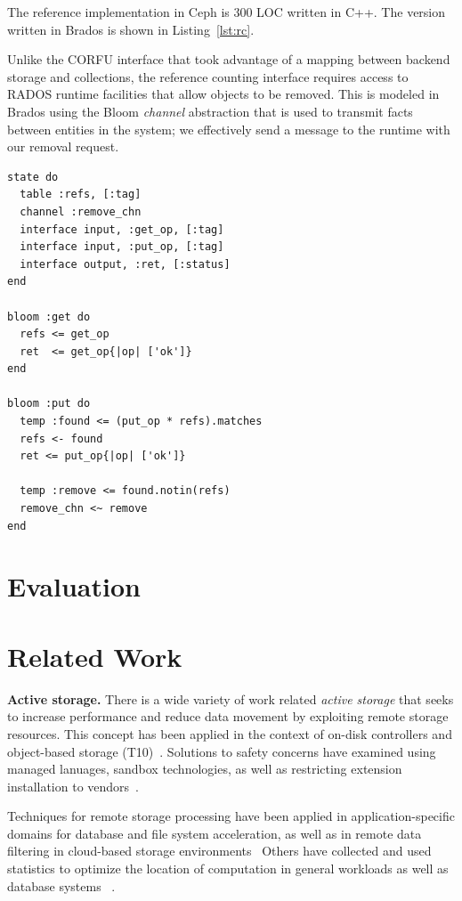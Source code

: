 \documentclass[10pt,twocolumn]{article}
\begin{document}
The reference implementation in Ceph is 300 LOC written in C++. The version
written in Brados is shown in Listing~\ref{lst:rc}.

 Unlike the CORFU interface
that took advantage of a mapping between backend storage and collections, the
reference counting interface requires access to RADOS runtime facilities that
allow objects to be removed. This is modeled in Brados using the Bloom
\emph{channel} abstraction that is used to transmit facts between entities in
the system; we effectively send a message to the runtime with our removal
request.

\begin{lstlisting}[caption={Reference counting interface}, label=lst:rc]
state do
  table :refs, [:tag]
  channel :remove_chn
  interface input, :get_op, [:tag]
  interface input, :put_op, [:tag]
  interface output, :ret, [:status]
end

bloom :get do
  refs <= get_op
  ret  <= get_op{|op| ['ok']}
end

bloom :put do
  temp :found <= (put_op * refs).matches
  refs <- found
  ret <= put_op{|op| ['ok']}

  temp :remove <= found.notin(refs)	
  remove_chn <~ remove
end
\end{lstlisting}

\section{Evaluation}

\section{Related Work}

{\bf Active storage.}
There is a wide variety of work related \emph{active storage} that seeks to
increase performance and reduce data movement by exploiting remote storage
resources. This concept has been applied in the context of on-disk
controllers and object-based storage
(T10)~\cite{riedel:vldb98,du:nwesp05,xie:msst11}.  Solutions to safety
concerns have examined using managed lanuages, sandbox technologies, as well
as restricting extension installation to
vendors~\cite{john:hiperio08,xie:msst11,runde:msst12}.

Techniques for remote storage processing have been applied in
application-specific domains for database and file system acceleration, as
well as in remote data filtering in cloud-based storage
environments~\cite{uysal:hpca00,chiu:iccs03,lim:msst08,gkantsidis:nsdi13}
Others have collected and used statistics to optimize the location of
computation in general workloads as well as database systems
~\cite{chen:cluster12,chen:icpp12,qiao:icde08}.
\end{document}
